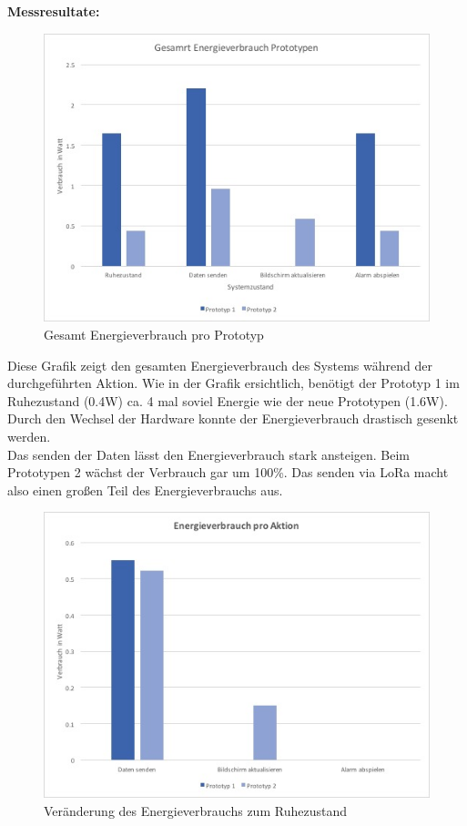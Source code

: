 \documentclass[11pt,english,german]{report}
\theoremstyle{definition}
\begin{document}
\newpage
\noindent
\textbf{Messresultate:}
\begin{figure}[H]
	\centering
	\includegraphics[width=\textwidth]{img/testing/energy_usage.jpg}
	\caption[Gesamt Energieverbrauch pro Prototyp]
	{Gesamt Energieverbrauch pro Prototyp}
\end{figure}
\noindent
Diese Grafik zeigt den gesamten Energieverbrauch des Systems während der durchgeführten Aktion.
Wie in der Grafik ersichtlich, benötigt der Prototyp 1 im Ruhezustand (0.4W) ca. 4 mal soviel Energie wie der neue Prototypen (1.6W). Durch den Wechsel der Hardware konnte der Energieverbrauch drastisch gesenkt werden.\\[0.3cm]
Das senden der Daten lässt den Energieverbrauch stark ansteigen. Beim Prototypen 2 wächst der Verbrauch gar um 100\%. Das senden via LoRa macht also einen großen Teil des Energieverbrauchs aus.
\newpage
\begin{figure}[H]
\centering
\includegraphics[width=\textwidth]{img/testing/energy_usage_perAction.jpg}
\caption[Veränderung des Energieverbrauchs zum Ruhezustand]
{Veränderung des Energieverbrauchs zum Ruhezustand}
\end{figure}
\end{document}
